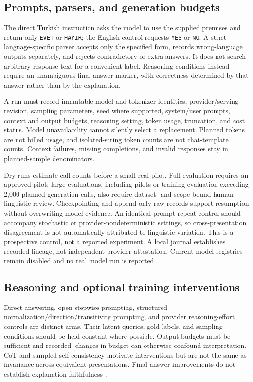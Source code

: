 \subsection{Prompts, parsers, and generation budgets}

The direct Turkish instruction asks the model to use the supplied premises and return only \texttt{EVET} or
\texttt{HAYIR}; the English control requests \texttt{YES} or \texttt{NO}. A strict language-specific parser
accepts only the specified form, records wrong-language outputs separately, and rejects contradictory or
extra answers. It does not search arbitrary response text for a convenient label. Reasoning conditions
instead require an unambiguous final-answer marker, with correctness determined by that answer rather than
by the explanation.

A run must record immutable model and tokenizer identities, provider/serving revision, sampling parameters,
seed where supported, system/user prompts, context and output budgets, reasoning setting, token usage,
truncation, and cost status. Model unavailability cannot silently select a replacement. Planned tokens are
not billed usage, and isolated-string token counts are not chat-template counts. Context failures, missing
completions, and invalid responses stay in planned-sample denominators.

Dry-runs estimate call counts before a small real pilot. Full evaluation requires an approved pilot; large
evaluations, including pilots or training evaluation exceeding 2,000 planned generation calls, also require
dataset- and scope-bound human linguistic review. Checkpointing and append-only raw records support
resumption without overwriting model evidence. An identical-prompt repeat control should accompany
stochastic or provider-nondeterministic settings, so cross-presentation disagreement is not automatically
attributed to linguistic variation. This is a prospective control, not a reported experiment. A local
journal establishes recorded lineage, not independent provider attestation. Current model registries remain
disabled and no real model run is reported.

\subsection{Reasoning and optional training interventions}

Direct answering, open stepwise prompting, structured normalization/direction/transitivity prompting, and
provider reasoning-effort controls are distinct arms. Their latent queries, gold labels, and sampling
conditions should be held constant where possible. Output budgets must be sufficient and recorded; changes
in budget can otherwise confound interpretation. CoT and sampled self-consistency \citep{wei2022cot,
wang2023selfconsistency} motivate interventions but are not the same as invariance across equivalent
presentations. Final-answer improvements do not establish explanation faithfulness
\citep{turpin2023unfaithful}.

